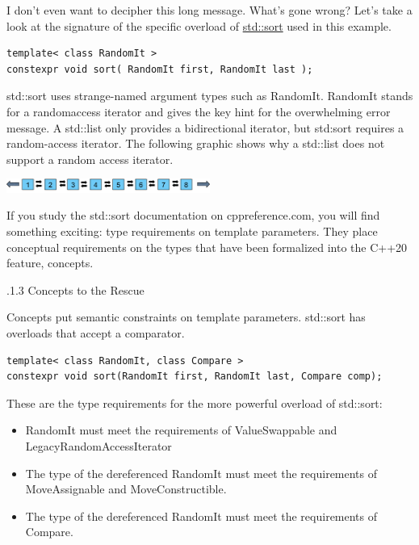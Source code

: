 I don’t even want to decipher this long message. What’s gone wrong? Let’s take a look at the signature of the specific overload of \href{https://en.cppreference.com/w/cpp/algorithm/sort}{std::sort} used in this example.

\begin{lstlisting}[style=styleCXX]
template< class RandomIt >
constexpr void sort( RandomIt first, RandomIt last );
\end{lstlisting}

std::sort uses strange-named argument types such as RandomIt. RandomIt stands for a randomaccess iterator and gives the key hint for the overwhelming error message. A std::list only provides a bidirectional iterator, but std:sort requires a random-access iterator. The following graphic shows why a std::list does not support a random access iterator.

\begin{center}
\includegraphics[width=0.5\textwidth]{content/3/chapter4/images/5.png}\\
\end{center}

If you study the std::sort documentation on cppreference.com, you will find something exciting: type requirements on template parameters. They place conceptual requirements on the types that have been formalized into the C++20 feature, concepts.

.1.3\hspace{0.2cm} Concepts to the Rescue

Concepts put semantic constraints on template parameters. std::sort has overloads that accept a comparator.

\begin{lstlisting}[style=styleCXX]
template< class RandomIt, class Compare >
constexpr void sort(RandomIt first, RandomIt last, Compare comp);
\end{lstlisting}

These are the type requirements for the more powerful overload of std::sort:

\begin{itemize}
\item 
RandomIt must meet the requirements of ValueSwappable and LegacyRandomAccessIterator

\item 
The type of the dereferenced RandomIt must meet the requirements of MoveAssignable and MoveConstructible.

\item 
The type of the dereferenced RandomIt must meet the requirements of Compare.
\end{itemize}

